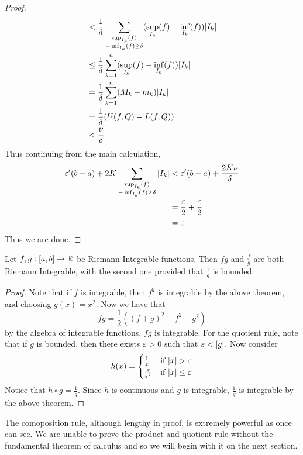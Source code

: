 \documentclass[a4paper]{article}
\begin{document}
\begin{thm}{}{}
\begin{proof}
\begin{align*}
&<\frac{1}{\delta}\sum_{\substack{\sup_{I_k}(f)\\-\inf_{I_k}(f)\geq\delta}}(\sup_{I_k}(f)-\inf_{I_k}(f))\abs{I_k}\\
&\leq\frac{1}{\delta}\sum_{k=1}^n(\sup_{I_k}(f)-\inf_{I_k}(f))\abs{I_k}\\
&=\frac{1}{\delta}\sum_{k=1}^n(M_k-m_k)\abs{I_k}\\
&=\frac{1}{\delta}(U(f,Q)-L(f,Q))\\
&<\frac{\nu}{\delta}
\end{align*}
Thus continuing from the main calculation, 
\begin{align*}
\varepsilon'(b-a)+2K\sum_{\substack{\sup_{I_k}(f)\\-\inf_{I_k}(f)\geq\delta}}\abs{I_k}&<\varepsilon'(b-a)+\frac{2K\nu}{\delta}\\
&=\frac{\varepsilon}{2}+\frac{\varepsilon}{2}\\
&=\varepsilon
\end{align*}
Thus we are done. 
\end{proof}
\end{thm}

\begin{thm}{}{} Let $f,g:[a,b]\to\mathbb{R}$ be Riemann Integrable functions. Then $fg$ and $\frac{f}{g}$ are both Riemann Integrable, with the second one provided that $\frac{1}{g}$ is bounded. \tcbline
\begin{proof} Note that if $f$ is integrable, then $f^2$ is integrable by the above theorem, and choosing $g(x)=x^2$. Now we have that $$fg=\frac{1}{2}((f+g)^2-f^2-g^2)$$ by the algebra of integrable functions, $fg$ is integrable. For the quotient rule, note that if $g$ is bounded, then there exists $\varepsilon>0$ such that $\varepsilon<\abs{g}$. Now consider $$h(x)=\begin{cases}
\frac{1}{x} & \text{if $\abs{x}>\varepsilon$}\\
\frac{x}{\varepsilon^2} & \text{if $\abs{x}\leq\varepsilon$}
\end{cases}$$
Notice that $h\circ g=\frac{1}{g}$. Since $h$ is continuous and $g$ is integrable, $\frac{1}{g}$ is integrable by the above theorem. 
\end{proof}
\end{thm}

The comoposition rule, although lengthy in proof, is extremely powerful as once can see. We are unable to prove the product and quotient rule without the fundamental theorem of calculus and so we will begin with it on the next section. 
\end{document}
